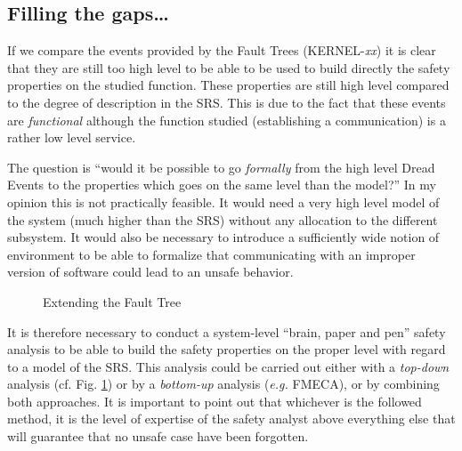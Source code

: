\documentclass{template/openetcs_article}
\begin{document}
\subsection{Filling the gaps\dots}
\label{gaps}
If we compare the events provided by the Fault Trees (KERNEL-\emph{xx}) it is clear that they are 
still too high level to be able to be used to build directly the safety properties on the studied 
function. These properties are still high level compared to the degree of description in the SRS. This 
is due to the fact that these events are \emph{functional} although the function studied (establishing
a communication) is a rather low level service.

The question is ``would it be possible to go \emph{formally} from the high level Dread Events to 
the properties which goes on the same level than the model?'' In my opinion this is not practically 
feasible. It would need a very high level model of the system (much higher than the SRS) without any 
allocation to the different subsystem. It would also be necessary to introduce a sufficiently wide 
notion of environment to be able to formalize that communicating with an improper version of software 
could lead to an unsafe behavior.

\begin{figure}
  \centering
  \caption{Extending the Fault Tree}
  \label{fig:ext_fta}
\end{figure}

It is therefore necessary to conduct a system-level ``brain, paper and pen'' safety analysis to 
be able to build the safety properties on the proper level with regard to a model of the SRS. This
analysis could be carried out either with a \emph{top-down} analysis (cf. Fig. \ref{fig:ext_fta}) or 
by a \emph{bottom-up} analysis (\emph{e.g.} FMECA), or by combining both approaches. It is important
to point out that whichever is the followed method, it is the level of expertise of the safety analyst
above everything else that will guarantee that no unsafe case have been forgotten.
\end{document}

